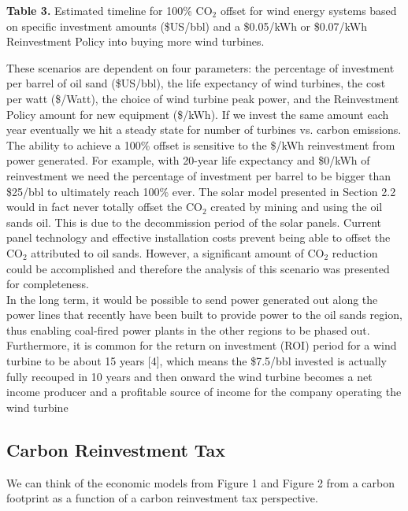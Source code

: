 \documentclass[11pt]{article}
\begin{document}
\begin{center}
{\bf Table 3.} Estimated timeline for 100\% CO$_2$ offset for wind energy systems based on specific investment amounts (\$US/bbl) and a \$0.05/kWh or \$0.07/kWh Reinvestment Policy into buying more wind turbines.
\end{center}

\indent These scenarios are dependent on four parameters: the percentage of investment per barrel of oil sand (\$US/bbl), the life expectancy of wind turbines, the cost per watt (\$/Watt), the choice of wind turbine peak power, and the Reinvestment Policy amount for new equipment (\$/kWh). If we invest the same amount each year eventually we hit a steady state for number of turbines vs. carbon emissions. The ability to achieve a 100\% offset is sensitive to the \$/kWh reinvestment from power generated. For example, with 20-year life expectancy and \$0/kWh of reinvestment we need the percentage of investment per barrel to be bigger than \$25/bbl to ultimately reach 100\% ever.
The solar model presented in Section 2.2 would in fact never totally offset the CO$_2$ created by mining and using the oil sands oil. This is due to the decommission period of the solar panels. Current panel technology and effective installation costs prevent being able to offset the CO$_2$ attributed to oil sands. However, a significant amount of CO$_2$ reduction could be accomplished and therefore the analysis of this scenario was presented for completeness.  \\
\indent In the long term, it would be possible to send power generated out along the power lines that recently have been built to provide power to the oil sands region, thus enabling coal-fired power plants in the other regions to be phased out. Furthermore, it is common for the return on investment (ROI) period for a wind turbine to be about 15 years [4], which means the \$7.5/bbl invested is actually fully recouped in 10 years and then onward the wind turbine becomes a net income producer and a profitable source of income for the company operating the wind turbine

\subsection{Carbon Reinvestment Tax}
We can think of the economic models from Figure 1 and Figure 2 from a carbon footprint as a function of a carbon reinvestment tax perspective.
\end{document}
